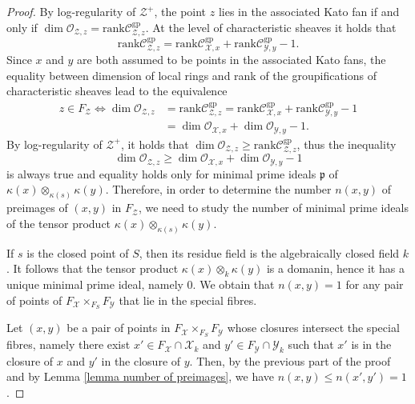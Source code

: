 \documentclass{amsart}%
\numberwithin{equation}{subsection}
\theoremstyle{plain2}
\theoremstyle{definition2}
\theoremstyle{stepstyle}
\theoremstyle{point}
\theoremstyle{subpoint}
\newcommand{\cX}{\ensuremath{\mathscr{X}}}
\newcommand{\fp}{\ensuremath{\mathfrak{p}}}
\newcommand{\caC}{\ensuremath{\mathcal{C}}}
\newcommand{\caO}{\ensuremath{\mathcal{O}}}
\newcommand{\cY}{\ensuremath{\mathscr{Y}}}
\newcommand{\cZ}{\ensuremath{\mathscr{Z}}}
\renewcommand{\cZ}{\ensuremath{\mathscr{Z}}}
\renewcommand{\cY}{\ensuremath{\mathscr{Y}}}
\newcommand{\Spec}{\ensuremath{\mathrm{Spec}\,}}
\newcommand{\rank}{\mathrm{rank}}
\begin{document}
\begin{proof}
By log-regularity of $\cZ^+$, the point $z$ lies in the associated Kato fan if and only if $\dim \caO_{\cZ,z}= \rank \caC_{\cZ,z}^{\text{gp}}$. At the level of characteristic sheaves it holds that $$\rank \caC_{\cZ,z}^{\text{gp}}= \rank \caC_{\cX,x}^{\text{gp}} + \rank \caC_{\cY,y}^{\text{gp}} - 1.$$ Since $x$ and $y$ are both assumed to be points in the associated Kato fans, the equality between dimension of local rings and rank of the groupifications of characteristic sheaves lead to the equivalence \begin{align*}
z \in F_{\cZ}  \Leftrightarrow \dim \caO_{\cZ,z} & = \rank \caC_{\cZ,z}^{\text{gp}} = \rank \caC_{\cX,x}^{\text{gp}} + \rank \caC_{\cY,y}^{\text{gp}} - 1 \\
& = \dim \caO_{\cX,x} +  \dim \caO_{\cY,y} -1.
\end{align*}
By log-regularity of $\cZ^+$, it holds that $\dim \caO_{\cZ,z} \geqslant \rank \caC_{\cZ,z}^{\text{gp}}$, thus the inequality $$\dim \caO_{\cZ,z} \geqslant \dim \caO_{\cX,x} +  \dim \caO_{\cY,y} -1$$ is always true and equality holds only for minimal prime ideals $\fp$ of $\kappa(x) \otimes_{\kappa(s)} \kappa(y)$. Therefore, in order to determine the number $n(x,y)$ of preimages of $(x,y)$ in $F_\cZ$, we need to study the number of minimal prime ideals of the tensor product $\kappa(x) \otimes_{\kappa(s)} \kappa(y)$. 

If $s$ is the closed point of $S$, then its residue field is the algebraically closed field $k$. It follows that the tensor product $\kappa(x) \otimes_{k} \kappa(y)$ is a domanin, hence it has a unique minimal prime ideal, namely $0$. We obtain that $n(x,y)=1$ for any pair of points of $F_\cX \times_{F_S} F_\cY$ that lie in the special fibres.

Let $(x,y)$ be a pair of points in $F_\cX \times_{F_S} F_\cY$ whose closures intersect the special fibres, namely there exist $x' \in F_\cX \cap \cX_k$ and $y' \in F_\cY \cap \cY_k$ such that $x'$ is in the closure of $x$ and $y'$ in the closure of $y$. Then, by the previous part of the proof and by Lemma \ref{lemma number of preimages}, we have $n(x,y) \leqslant n(x',y') =1$. 
\end{proof}
\end{document}
